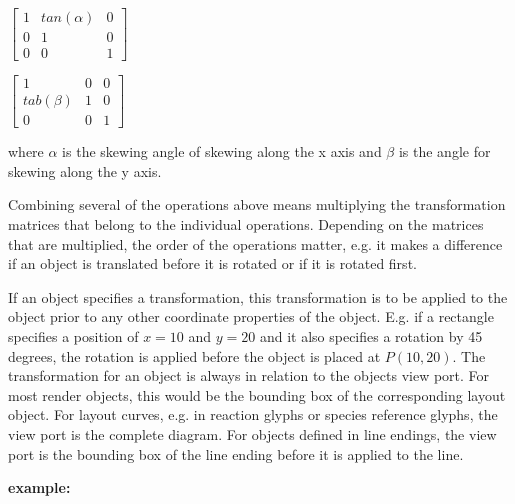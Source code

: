 \hspace*{0.4cm}
\begin{center}
\begin{math}\left[ \begin{array}{ccc} 1 & tan(\alpha) & 0 \\ 0 & 1 & 0 \\ 0 & 0 & 1\end{array}\right]\end{math}
\end{center}
\hspace*{0.4cm}


\hspace*{0.4cm}
\begin{center}
\begin{math}\left[ \begin{array}{ccc} 1 & 0 & 0 \\ tab(\beta) & 1 & 0 \\ 0 & 0 & 1\end{array}\right]\end{math}
\end{center}
\hspace*{0.4cm}

where $\alpha$ is the skewing angle of skewing along the x axis and $\beta$ is the angle for skewing along the y axis.

Combining several of the operations above means multiplying the transformation matrices that belong to the individual operations.
Depending on the matrices that are multiplied, the order of the operations matter, e.g. it makes a difference if an object is translated before it is rotated or if it is rotated first.

If an object specifies a transformation, this transformation is to be applied to the object prior to any other coordinate properties of the object. E.g. if a rectangle specifies a position of $x=10$ and $y=20$ and it also specifies a rotation by 45 degrees, the rotation is applied before the object is placed at $P(10,20)$.
The transformation for an object is always in relation to the objects view port. For most render objects, this would be the bounding box of the corresponding layout object. For layout curves, e.g. in reaction glyphs or species reference glyphs, the view port is the complete diagram.
For objects defined in line endings, the view port is the bounding box of the line ending before it is applied to the line.

\vspace*{0.25cm}
{\large
{\bf
example:
}
}

